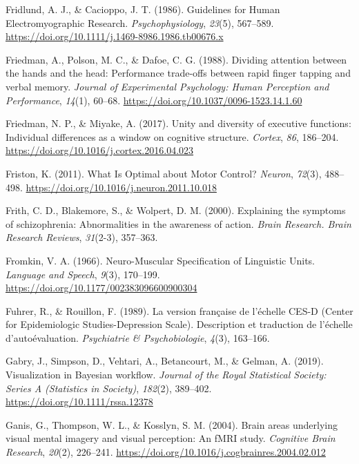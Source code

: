 \documentclass[a4paper,12pt,twoside,onecolumn,openright,final,oldfontcommands]{memoir}
\begin{document}
\leavevmode\hypertarget{ref-fridlund_guidelines_1986}{}%
Fridlund, A. J., \& Cacioppo, J. T. (1986). Guidelines for Human Electromyographic Research. \emph{Psychophysiology}, \emph{23}(5), 567--589. \url{https://doi.org/10.1111/j.1469-8986.1986.tb00676.x}

\leavevmode\hypertarget{ref-friedman_dividing_1988}{}%
Friedman, A., Polson, M. C., \& Dafoe, C. G. (1988). Dividing attention between the hands and the head: Performance trade-offs between rapid finger tapping and verbal memory. \emph{Journal of Experimental Psychology: Human Perception and Performance}, \emph{14}(1), 60--68. \url{https://doi.org/10.1037/0096-1523.14.1.60}

\leavevmode\hypertarget{ref-friedman_unity_2017}{}%
Friedman, N. P., \& Miyake, A. (2017). Unity and diversity of executive functions: Individual differences as a window on cognitive structure. \emph{Cortex}, \emph{86}, 186--204. \url{https://doi.org/10.1016/j.cortex.2016.04.023}

\leavevmode\hypertarget{ref-friston_what_2011}{}%
Friston, K. (2011). What Is Optimal about Motor Control? \emph{Neuron}, \emph{72}(3), 488--498. \url{https://doi.org/10.1016/j.neuron.2011.10.018}

\leavevmode\hypertarget{ref-frith_explaining_2000}{}%
Frith, C. D., Blakemore, S., \& Wolpert, D. M. (2000). Explaining the symptoms of schizophrenia: Abnormalities in the awareness of action. \emph{Brain Research. Brain Research Reviews}, \emph{31}(2-3), 357--363.

\leavevmode\hypertarget{ref-fromkin_neuro-muscular_1966}{}%
Fromkin, V. A. (1966). Neuro-Muscular Specification of Linguistic Units. \emph{Language and Speech}, \emph{9}(3), 170--199. \url{https://doi.org/10.1177/002383096600900304}

\leavevmode\hypertarget{ref-fuhrer_version_1989}{}%
Fuhrer, R., \& Rouillon, F. (1989). La version française de l'échelle CES-D (Center for Epidemiologic Studies-Depression Scale). Description et traduction de l'échelle d'autoévaluation. \emph{Psychiatrie \& Psychobiologie}, \emph{4}(3), 163--166.

\leavevmode\hypertarget{ref-gabry_visualization_2019}{}%
Gabry, J., Simpson, D., Vehtari, A., Betancourt, M., \& Gelman, A. (2019). Visualization in Bayesian workﬂow. \emph{Journal of the Royal Statistical Society: Series A (Statistics in Society)}, \emph{182}(2), 389--402. \url{https://doi.org/10.1111/rssa.12378}

\leavevmode\hypertarget{ref-ganis_brain_2004}{}%
Ganis, G., Thompson, W. L., \& Kosslyn, S. M. (2004). Brain areas underlying visual mental imagery and visual perception: An fMRI study. \emph{Cognitive Brain Research}, \emph{20}(2), 226--241. \url{https://doi.org/10.1016/j.cogbrainres.2004.02.012}
\end{document}
